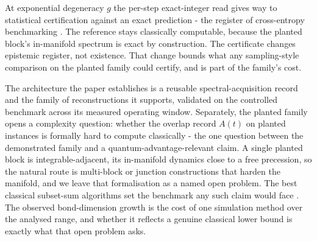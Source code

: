 At exponential degeneracy $g$ the per-step exact-integer read gives way to statistical certification against an exact prediction - the register of cross-entropy benchmarking \cite{boixo2018xeb}. The reference stays classically computable, because the planted block's in-manifold spectrum is exact by construction. The certificate changes epistemic register, not existence. That change bounds what any sampling-style comparison on the planted family could certify, and is part of the family's cost.

The architecture the paper establishes is a reusable spectral-acquisition record and the family of reconstructions it supports, validated on the controlled benchmark across its measured operating window. Separately, the planted family opens a complexity question: whether the overlap record $A(t)$ on planted instances is formally hard to compute classically - the one question between the demonstrated family and a quantum-advantage-relevant claim. A single planted block is integrable-adjacent, its in-manifold dynamics close to a free precession, so the natural route is multi-block or junction constructions that harden the manifold, and we leave that formalisation as a named open problem. The best classical subset-sum algorithms set the benchmark any such claim would face \cite{bonnetain2020improved}. The observed bond-dimension growth is the cost of one simulation method over the analysed range, and whether it reflects a genuine classical lower bound is exactly what that open problem asks.
